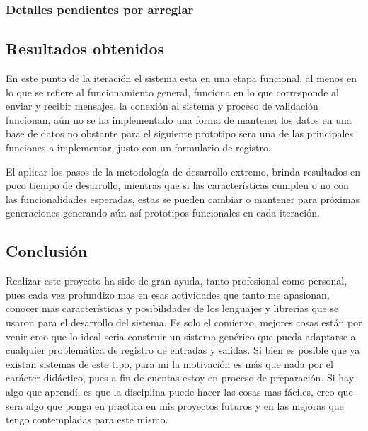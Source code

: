 \documentclass[12pt]{article} %
\begin{document}
		\subsubsection{Detalles pendientes por arreglar}
			
  \subsection{Resultados obtenidos}
  	En este punto de la iteraci\'on el sistema esta en una etapa funcional, al menos en lo que se refiere al funcionamiento general, funciona en lo que corresponde al enviar
  	y recibir mensajes, la conexión al sistema y proceso de validación funcionan, a\'un no se ha implementado una forma de mantener los datos en una base de datos no obstante
  	para el siguiente prototipo sera una de las principales funciones a implementar, justo con un formulario  de registro.
  	
  	El aplicar los pasos de la metodología de desarrollo extremo, brinda resultados en poco tiempo de desarrollo, mientras que si las características cumplen o no con las 
  	funcionalidades esperadas, estas se pueden cambiar o mantener para próximas generaciones generando a\'un as\'i prototipos funcionales en cada iteraci\'on.
	
  \subsection{Conclusión}
  
  	Realizar este proyecto ha sido de gran ayuda, tanto profesional como personal, pues cada vez profundizo mas en esas actividades que tanto me apasionan, conocer mas
  	características y posibilidades de los lenguajes y librerías que se usaron para el desarrollo del sistema.
  	Es solo el comienzo, mejores cosas están por venir creo que lo ideal seria construir un sistema genérico que pueda adaptarse a cualquier problemática de registro de 
  	entradas y salidas.
  	Si bien es posible que ya existan sistemas de este tipo, para mi la motivaci\'on es m\'as que nada por el carácter didáctico, pues a fin de cuentas estoy en proceso de 
  	preparación.
  	Si hay algo que aprendí, es que la disciplina puede hacer las cosas mas fáciles, creo que sera algo que ponga en practica en mis proyectos futuros y en las mejoras que 
  	tengo contempladas para este mismo.
\newpage
\end{document}
